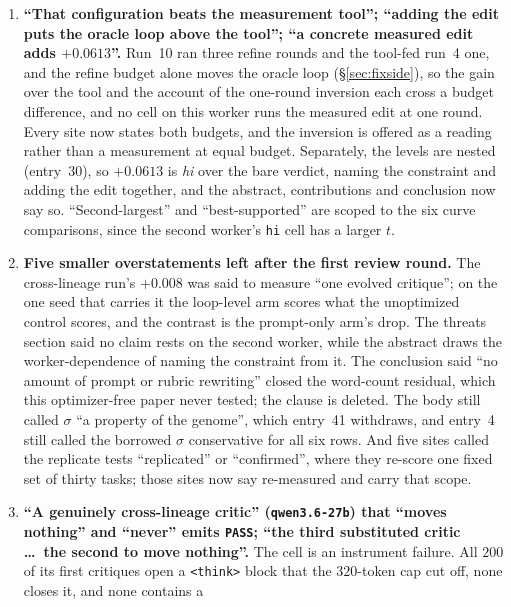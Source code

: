\documentclass[11pt]{article}
\begin{document}
\begin{enumerate}
    is a different model from the same vendor, and uses ``cross-lineage critic'' as the series'
    name for it and not as a claim about its training.
  \item \textbf{``That configuration beats the measurement tool''; ``adding the edit puts the
    oracle loop above the tool''; ``a concrete measured edit adds $+0.0613$''.} Run~10 ran three
    refine rounds and the tool-fed run~4 one, and the refine budget alone moves the oracle loop
    (\S\ref{sec:fixside}), so the gain over the tool and the account of the one-round inversion
    each cross a budget difference, and no cell on this worker runs the measured edit at one round.
    Every site now states both budgets, and the inversion is offered as a reading rather than a
    measurement at equal budget. Separately, the levels are nested (entry~30), so $+0.0613$ is
    \emph{hi} over the bare verdict, naming the constraint and adding the edit together, and the
    abstract, contributions and conclusion now say so. ``Second-largest'' and ``best-supported''
    are scoped to the six curve comparisons, since the second worker's \texttt{hi} cell has a
    larger $t$.
  \item \textbf{Five smaller overstatements left after the first review round.} The
    cross-lineage run's $+0.008$ was said to measure ``one evolved critique''; on the one seed that
    carries it the loop-level arm scores what the unoptimized control scores, and the contrast is
    the prompt-only arm's drop. The threats section said no claim rests on the second worker,
    while the abstract draws the worker-dependence of naming the constraint from it. The conclusion
    said ``no amount of prompt or rubric rewriting'' closed the word-count residual, which this
    optimizer-free paper never tested; the clause is deleted. The body still called $\sigma$ ``a
    property of the genome'', which entry~41 withdraws, and entry~4 still called the borrowed
    $\sigma$ conservative for all six rows. And five sites called the replicate tests
    ``replicated'' or ``confirmed'', where they re-score one fixed set of thirty tasks; those
    sites now say re-measured and carry that scope.
  \item \textbf{``A genuinely cross-lineage critic'' (\texttt{qwen3.6-27b}) that ``moves nothing'' and
    ``never'' emits \texttt{PASS}; ``the third substituted critic \ldots\ the second to move
    nothing''.} The cell is an instrument failure. All $200$ of its first critiques open a
    \texttt{<think>} block that the $320$-token cap cut off, none closes it, and none contains a

\end{enumerate}
\end{document}
